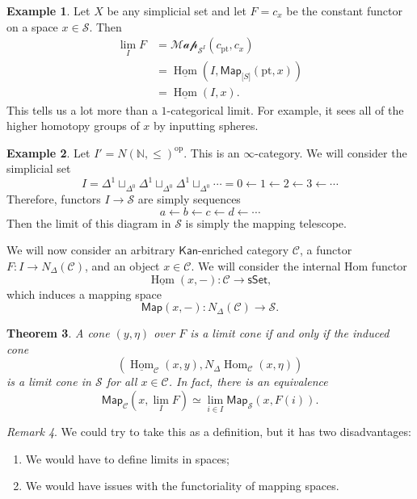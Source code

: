 \documentclass[10pt, oneside]{memoir}
\newtheorem{thm}{Theorem}[subsection]
\theoremstyle{definition}
\newtheorem{exm}[thm]{Example}
\theoremstyle{remark}
\newtheorem{rmk}[thm]{Remark}
\theoremstyle{plain}
\theoremstyle{definition}
\theoremstyle{remark}
\newcommand{\N}{\mathbb{N}}
\newcommand{\mc}[1]{\mathcal{#1}}
\newcommand{\mr}[1]{\mathrm{#1}}
\newcommand{\ms}[1]{\mathsf{#1}}
\newcommand{\ul}[1]{\underline{#1}}
\newcommand{\1}{\mathbf{1}}
\newcommand{\2}{\mathbf{2}}
\newcommand{\3}{\mathbf{3}}
\DeclareMathOperator{\Hom}{Hom}
\DeclareMathOperator{\op}{op}
\begin{document}
\begin{exm}
    Let $X$ be any simplicial set and let $F = c_x$ be the constant functor on a space $x \in \mc{S}$. Then
    \begin{align*}
        \lim_I F &= \mc{Map}_{\mc{S}^I}(c_{\mr{pt}}, c_x) \\
        &= \ul{\Hom}(I, \ms{Map}_{\mc[S]}(\mr{pt}, x)) \\
        &= \ul{\Hom}(I, x).
    \end{align*}
    This tells us a lot more than a $1$-categorical limit. For example, it sees all of the higher homotopy groups of $x$ by inputting spheres.
\end{exm}

\begin{exm}
    Let $I' = N(\N, \leq)^{\op}$. This is an $\infty$-category. We will consider the simplicial set
    \[ I = \Delta^1 \sqcup_{\Delta^0} \Delta^1 \sqcup_{\Delta^0} \Delta^1 \sqcup_{\Delta^0} \cdots = 0 \gets 1 \gets 2 \gets 3 \gets \cdots \]
    Therefore, functors $I \to \mc{S}$ are simply sequences
    \[ a \gets b \gets c \gets d \gets \cdots \]
    Then the limit of this diagram in $\mc{S}$ is simply the mapping telescope.
\end{exm}

We will now consider an arbitrary $\ms{Kan}$-enriched category $\mc{C}$, a functor $F \colon I \to N_{\Delta}(\mc{C})$, and an object $x \in \mc{C}$. We will consider the internal Hom functor
\[ \ul{\Hom}(x, -) \colon \mc{C} \to \ms{sSet}, \]
which induces a mapping space
\[ \ms{Map}(x, -) \colon N_{\Delta}(\mc{C}) \to \mc{S}. \]

\begin{thm}\label{thm:limitsviaspaces}
    A cone $(y, \eta)$ over $F$ is a limit cone if and only if the induced cone
    \[ (\ul{\Hom}_{\mc{C}}(x, y), N_{\Delta} \Hom_{\mc{C}}(x, \eta)) \]
    is a limit cone in $\mc{S}$ for all $x \in \mc{C}$. In fact, there is an equivalence
    \[ \ms{Map}_{\mc{C}}(x, \lim_I F) \simeq \lim_{i \in I} \ms{Map}_{\mc{S}}(x, F(i)). \]
\end{thm}

\begin{rmk}
    We could try to take this as a definition, but it has two disadvantages:
    \begin{enumerate}
        \item We would have to define limits in spaces;
        \item We would have issues with the functoriality of mapping spaces.
    \end{enumerate}
\end{rmk}
\end{document}

